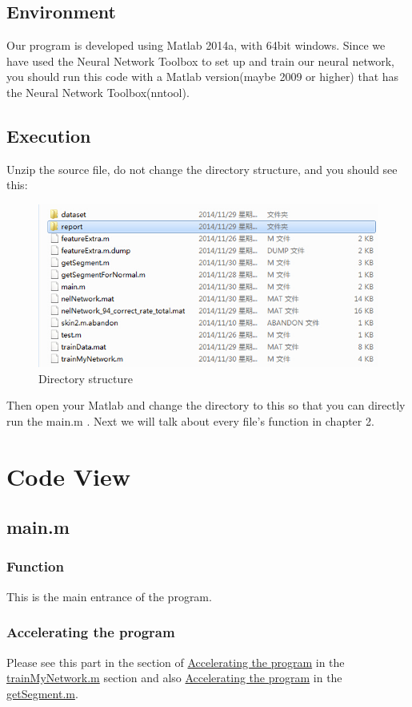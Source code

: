 \documentclass[14pt]{report} %
\begin{document}
\section{Environment}
	Our program is developed using Matlab 2014a, with 64bit windows. Since we have used the Neural Network Toolbox to set up and train our neural network, you should run this code with a Matlab version(maybe 2009 or higher) that has the Neural Network Toolbox(nntool).
\section{Execution}
	Unzip the source file, do not change the directory structure, and you should see this:
	\begin{figure}[H]\includegraphics[width=\textwidth]{image/directory_structure.jpg} \caption{Directory structure}  \label{fig:dirStruct} \end{figure}
	Then open your Matlab and change the directory to this so that you can directly run the main.m . Next we will talk about every file's function in chapter 2.

\chapter{Code View}
\clearpage
\section{main.m}
\subsection{Function}
	This is the main entrance of the program.
\subsection{Accelerating the program}
	Please see this part in the section of \hyperref[subsection:Accelerating the program]{Accelerating the program} in the \hyperref[section:trainMyNetwork.m]{trainMyNetwork.m} section and also \hyperref[subsection:Accelerating the program2]{Accelerating the program} in the \hyperref[section:getSegment.m]{getSegment.m}.
\end{document}
